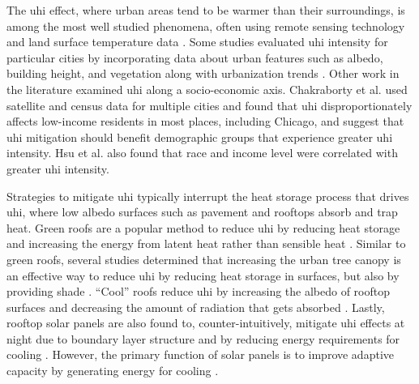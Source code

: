 The \ac{uhi} effect, where urban areas tend to be warmer than their surroundings,
is among the most well studied phenomena, often using remote sensing technology and land
surface temperature data \cite{almeida_study_2021, cotlier_extreme_2022}.
Some studies evaluated \ac{uhi} intensity for particular cities by incorporating
data about urban features such as albedo, building height, and vegetation
\cite{sangiorgio_development_2020,abulibdeh_analysis_2021} along with urbanization
trends \cite{li_how_2021}. Other work in the literature examined \ac{uhi} along
a socio-economic axis. Chakraborty et al. \cite{chakraborty_disproportionately_2019}
used satellite and census data for multiple cities and found that \ac{uhi}
disproportionately affects low-income residents in most places, including Chicago,
and suggest that \ac{uhi} mitigation should benefit demographic groups that experience
greater \ac{uhi} intensity. Hsu et al. \cite{hsu_disproportionate_2021} also
found that race and income level were correlated with greater \ac{uhi} intensity.

Strategies to mitigate \ac{uhi} typically interrupt the heat storage process that
drives \ac{uhi}, where
low albedo surfaces such as pavement and rooftops absorb and trap heat. Green roofs
are a popular method to reduce \ac{uhi} by reducing heat storage and increasing
the energy from latent heat rather than sensible heat \cite{zhang_effectiveness_2017}.
Similar to green roofs, several studies determined that increasing the urban
tree canopy is an effective way to reduce \ac{uhi} by reducing heat storage in
surfaces, but also by providing shade \cite{middel_urban_2015,
loughner_roles_2012, mcdonald_tree_2021, marando_urban_2022, schwaab_role_2021}.
``Cool'' roofs reduce \ac{uhi} by increasing the albedo of rooftop surfaces and
decreasing the amount of radiation that gets absorbed \cite{zhang_effectiveness_2017,
salamanca_citywide_2016, middel_urban_2015}. Lastly, rooftop solar panels are also
found to, counter-intuitively, mitigate \ac{uhi} effects at night due to boundary
layer structure and by reducing energy requirements for cooling \cite{masson_solar_2014,
sailor_photovoltaics_2021, salamanca_citywide_2016}. However, the primary
function of solar panels is to improve adaptive capacity by generating energy
for cooling \cite{masson_solar_2014}.

